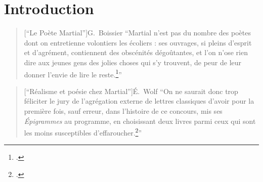 \chapter*{Introduction}
\label{intro}

\begin{quote}[\enquote{Le Poète Martial}]{G.~Boissier}
    \enquote{Martial n’est pas du nombre des poètes dont on entretienne volontiers les écoliers : ses ouvrages, si pleins d’esprit et d’agrément, contiennent des obscénités dégoûtantes, et l’on n’ose rien dire aux jeunes gens des jolies choses qui s’y trouvent, de peur de leur donner l’envie de lire le reste.\footcite{boissier_poete_1900}}
\end{quote}

\begin{quote}[\enquote{Réalisme et poésie chez Martial}]{É.~Wolf}
    \enquote{On ne saurait donc trop féliciter le jury de l'agrégation externe de lettres classiques d'avoir pour la première fois, sauf erreur, dans l'histoire de ce concours, mis ses \textit{Épigrammes} au programme, en choisissant deux livres parmi ceux qui sont les moins susceptibles d'effaroucher.\footcite{wolff_realisme_1997}}
\end{quote}

